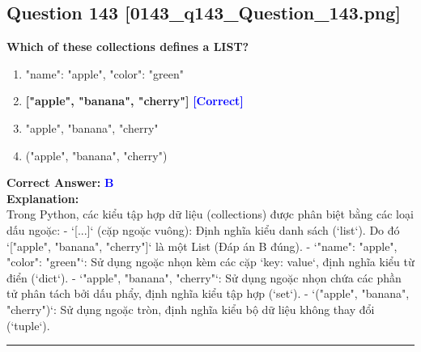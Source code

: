 \documentclass[11pt,a4paper]{article}
\begin{document}
\begin{minipage}{\textwidth}
\subsection*{Question 143 \quad \footnotesize{[0143_q143_Question_143.png]}}
\noindent \textbf{Which of these collections defines a LIST?}

\begin{enumerate}[label=\Alph*.]
    \item "name": "apple", "color": "green"
    \item \textbf{["apple", "banana", "cherry"]} \hfill \textcolor{blue}{\textbf{[Correct]}}
    \item "apple", "banana", "cherry"
    \item ("apple", "banana", "cherry")
\end{enumerate}

\noindent \textbf{Correct Answer:} \textcolor{blue}{\textbf{B}} \\[4pt]
\noindent \textbf{Explanation:}\\
Trong Python, các kiểu tập hợp dữ liệu (collections) được phân biệt bằng các loại dấu ngoặc:\newline
- `[...]` (cặp ngoặc vuông): Định nghĩa kiểu danh sách (`list`). Do đó `["apple", "banana", "cherry"]` là một List (Đáp án B đúng).\newline
- `{"name": "apple", "color": "green"}`: Sử dụng ngoặc nhọn kèm các cặp `key: value`, định nghĩa kiểu từ điển (`dict`).\newline
- `{"apple", "banana", "cherry"}`: Sử dụng ngoặc nhọn chứa các phần tử phân tách bởi dấu phẩy, định nghĩa kiểu tập hợp (`set`).\newline
- `("apple", "banana", "cherry")`: Sử dụng ngoặc tròn, định nghĩa kiểu bộ dữ liệu không thay đổi (`tuple`).
\end{minipage}
\vspace{0.8cm}
\hrule
\vspace{0.5cm}
\end{document}
